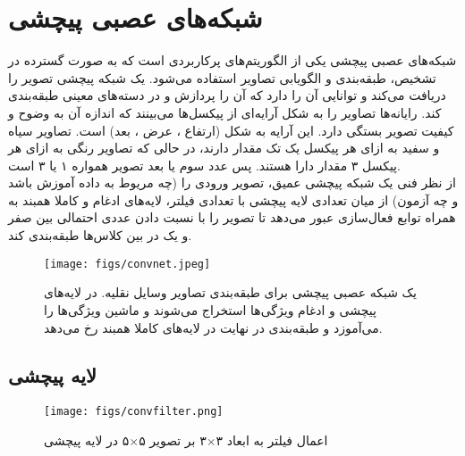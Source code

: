 \section{شبکه‌های عصبی پیچشی} 
\label{cnn}
شبکه‌های عصبی پیچشی
 یکی از الگوریتم‌های پرکاربردی است که به صورت گسترده در تشخیص، طبقه‌بندی و الگویابی تصاویر استفاده می‌شود. یک شبکه پیچشی تصویر را دریافت می‌کند و توانایی آن را دارد که آن را پردازش و در دسته‌های معینی طبقه‌بندی کند. رایانه‌ها تصاویر را به شکل آرایه‌‌ای از پیکسل‌ها می‌بینند که اندازه آن به وضوح و کیفیت تصویر بستگی دارد. این آرایه به شکل (ارتفاع ، عرض ، بعد) است. تصاویر سیاه و سفید به ازای هر پیکسل یک تک مقدار دارند، در حالی که تصاویر رنگی به ازای هر پیکسل ۳ مقدار دارا هستند. پس عدد سوم یا بعد تصویر همواره ۱ یا ۳ است.
\\
از نظر فنی یک شبکه پیچشی عمیق، تصویر ورودی را (چه مریوط به داده آموزش باشد و چه آزمون) از میان تعدادی لایه پیچشی 
با تعدادی فیلتر، لایه‌های ادغام
 و کاملا همبند به همراه توابع فعال‌سازی عبور می‌دهد تا تصویر را با نسبت دادن عددی احتمالی بین صفر و یک در بین کلاس‌ها طبقه‌بندی کند.
\cite{aloysius2017review}
 \begin{figure}[h!]
	\begin{center}
		\texttt{[image: figs/convnet.jpeg]}
	\end{center}
	\caption[یک شبکه عصبی پیچشی برای طبقه‌بندی تصاویر وسایل نقلیه. در لایه‌های پیچشی و ادغام ویژگی‌ها استخراج می‌شوند و ماشین ویژگی‌ها را می‌آموزد و طبقه‌بندی در نهایت در لایه‌های کاملا همبند رخ می‌دهد.]{
		یک شبکه عصبی پیچشی برای طبقه‌بندی تصاویر وسایل نقلیه. در لایه‌های پیچشی و ادغام ویژگی‌ها استخراج می‌شوند و ماشین ویژگی‌ها را می‌آموزد و طبقه‌بندی در نهایت در لایه‌های کاملا همبند رخ می‌دهد.
		\footnotemark}
	\label{fig:convnet}
\end{figure}    
\subsection{لایه پیچشی}

\begin{figure}[h!]
	\begin{center}
		\texttt{[image: figs/convfilter.png]}
	\end{center}
	\caption[
	اعمال فیلتر به ابعاد
	۳$\times$۳
	بر تصویر
	۵$\times$۵ 
	در لایه پیچشی.]
	{
		اعمال فیلتر به ابعاد
		۳$\times$۳
		بر تصویر
		۵$\times$۵ 
		در لایه پیچشی
		\footnotemark}
	\label{fig:convfilter}
\end{figure}    

